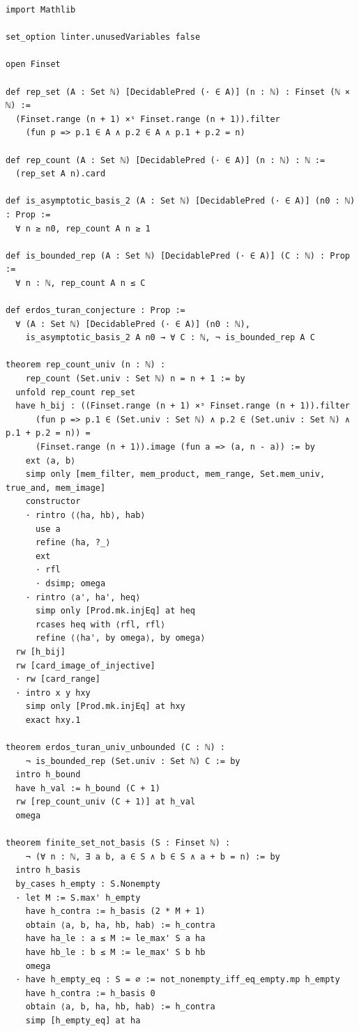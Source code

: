 \documentclass[11pt,a4paper]{article}
\theoremstyle{definition}
\begin{document}
\begin{lstlisting}[caption={Formal Lean 4 Implementation of Additive Bases and Representation Functions}]
import Mathlib

set_option linter.unusedVariables false

open Finset

def rep_set (A : Set ℕ) [DecidablePred (· ∈ A)] (n : ℕ) : Finset (ℕ × ℕ) :=
  (Finset.range (n + 1) ×ˢ Finset.range (n + 1)).filter
    (fun p => p.1 ∈ A ∧ p.2 ∈ A ∧ p.1 + p.2 = n)

def rep_count (A : Set ℕ) [DecidablePred (· ∈ A)] (n : ℕ) : ℕ :=
  (rep_set A n).card

def is_asymptotic_basis_2 (A : Set ℕ) [DecidablePred (· ∈ A)] (n0 : ℕ) : Prop :=
  ∀ n ≥ n0, rep_count A n ≥ 1

def is_bounded_rep (A : Set ℕ) [DecidablePred (· ∈ A)] (C : ℕ) : Prop :=
  ∀ n : ℕ, rep_count A n ≤ C

def erdos_turan_conjecture : Prop :=
  ∀ (A : Set ℕ) [DecidablePred (· ∈ A)] (n0 : ℕ),
    is_asymptotic_basis_2 A n0 → ∀ C : ℕ, ¬ is_bounded_rep A C

theorem rep_count_univ (n : ℕ) :
    rep_count (Set.univ : Set ℕ) n = n + 1 := by
  unfold rep_count rep_set
  have h_bij : ((Finset.range (n + 1) ×ˢ Finset.range (n + 1)).filter
      (fun p => p.1 ∈ (Set.univ : Set ℕ) ∧ p.2 ∈ (Set.univ : Set ℕ) ∧ p.1 + p.2 = n)) =
      (Finset.range (n + 1)).image (fun a => (a, n - a)) := by
    ext ⟨a, b⟩
    simp only [mem_filter, mem_product, mem_range, Set.mem_univ, true_and, mem_image]
    constructor
    · rintro ⟨⟨ha, hb⟩, hab⟩
      use a
      refine ⟨ha, ?_⟩
      ext
      · rfl
      · dsimp; omega
    · rintro ⟨a', ha', heq⟩
      simp only [Prod.mk.injEq] at heq
      rcases heq with ⟨rfl, rfl⟩
      refine ⟨⟨ha', by omega⟩, by omega⟩
  rw [h_bij]
  rw [card_image_of_injective]
  · rw [card_range]
  · intro x y hxy
    simp only [Prod.mk.injEq] at hxy
    exact hxy.1

theorem erdos_turan_univ_unbounded (C : ℕ) :
    ¬ is_bounded_rep (Set.univ : Set ℕ) C := by
  intro h_bound
  have h_val := h_bound (C + 1)
  rw [rep_count_univ (C + 1)] at h_val
  omega

theorem finite_set_not_basis (S : Finset ℕ) :
    ¬ (∀ n : ℕ, ∃ a b, a ∈ S ∧ b ∈ S ∧ a + b = n) := by
  intro h_basis
  by_cases h_empty : S.Nonempty
  · let M := S.max' h_empty
    have h_contra := h_basis (2 * M + 1)
    obtain ⟨a, b, ha, hb, hab⟩ := h_contra
    have ha_le : a ≤ M := le_max' S a ha
    have hb_le : b ≤ M := le_max' S b hb
    omega
  · have h_empty_eq : S = ∅ := not_nonempty_iff_eq_empty.mp h_empty
    have h_contra := h_basis 0
    obtain ⟨a, b, ha, hb, hab⟩ := h_contra
    simp [h_empty_eq] at ha
\end{lstlisting}
\end{document}
